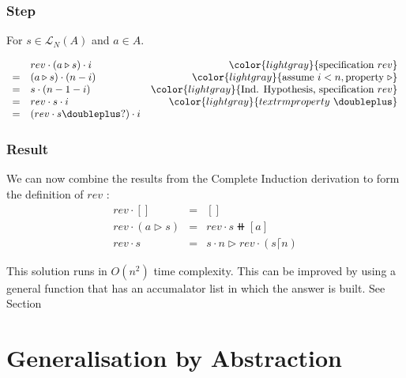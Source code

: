 \documentclass[onesided]{memoir}
\begin{document}
        \colorbox{lightgray}{\color{white}{As we start counting at 0, this is correct. }}

        \subsection{Step}
        For $s\in\mathcal{L}_N(A)$ and $a\in A$.
        
        \begin{displaymath} \begin{array}{llr}       
          & rev\cdot(a\triangleright s)\cdot i & \color{lightgray}{\textrm{specification~} rev} \\
        = & (a\triangleright s)\cdot (n-i) & \color{lightgray}{\textrm{assume~} i<n, \textrm{property~} \triangleright}\\
        = & s \cdot (n-1-i) & \color{lightgray}{\textrm{Ind. Hypothesis, specification~} rev}\\
        = & rev \cdot s \cdot i & \color{lightgray}{textrm{property~}\doubleplus}\\
        = & (rev \cdot s \doubleplus \boldmath{?}) \cdot i & 
        \end{array} \end{displaymath}

        \subsection{Result}
        We can now combine the results from the Complete Induction derivation to form the definition of $rev$ :
        \begin{displaymath}\begin{array}{lll}
            rev \cdot [] & = & [] \\
            rev \cdot (a \triangleright s) & = & rev \cdot s \doubleplus [a] \\
            rev \cdot s & = & s \cdot n \triangleright rev \cdot (s \lceil n)
        \end{array}\end{displaymath}
        
        This solution runs in $O(n^2)$ time complexity. This can be improved by using a general function that has an accumalator list in which the answer is built. See Section~\label{general:grev}

    \chapter{Generalisation by Abstraction} \newpage \pagecolor{white}
        
\end{document}

